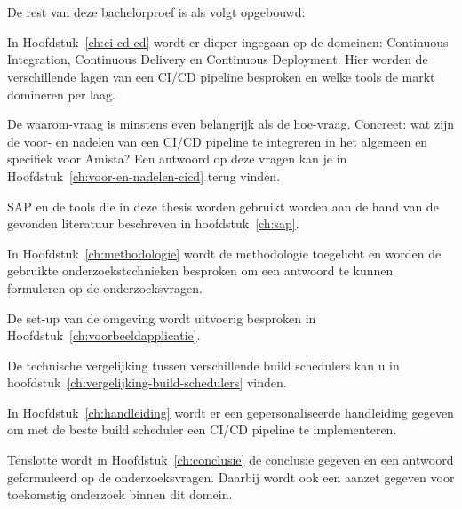 \section{}
\label{sec:opzet-bachelorproef}


De rest van deze bachelorproef is als volgt opgebouwd:

In Hoofdstuk~\ref{ch:ci-cd-cd} wordt er dieper ingegaan op de domeinen: Continuous Integration, Continuous Delivery en Continuous Deployment. Hier worden de verschillende lagen van een CI/CD pipeline besproken en welke tools de markt domineren per laag.

De waarom-vraag is minstens even belangrijk als de hoe-vraag. Concreet: wat zijn de voor- en nadelen van een CI/CD pipeline te integreren in het algemeen en specifiek voor Amista? Een antwoord op deze vragen kan je in Hoofdstuk~\ref{ch:voor-en-nadelen-cicd} terug vinden.

SAP en de tools die in deze thesis worden gebruikt worden aan de hand van de gevonden literatuur beschreven in hoofdstuk~\ref{ch:sap}.

In Hoofdstuk~\ref{ch:methodologie} wordt de methodologie toegelicht en worden de gebruikte onderzoekstechnieken besproken om een antwoord te kunnen formuleren op de onderzoeksvragen.

De set-up van de omgeving wordt uitvoerig besproken in Hoofdstuk~\ref{ch:voorbeeldapplicatie}.

De technische vergelijking tussen verschillende build schedulers kan u in hoofdstuk~\ref{ch:vergelijking-build-schedulers} vinden.

In Hoofdstuk~\ref{ch:handleiding} wordt er een gepersonaliseerde handleiding gegeven om met de beste build scheduler een CI/CD pipeline te implementeren.

Tenslotte wordt in Hoofdstuk~\ref{ch:conclusie} de conclusie gegeven en een antwoord geformuleerd op de onderzoeksvragen. Daarbij wordt ook een aanzet gegeven voor toekomstig onderzoek binnen dit domein.